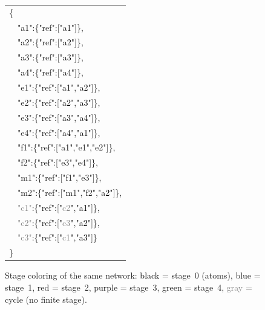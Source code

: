 \begin{figure}[ht]
\centering
\begin{minipage}[t]{0.48\textwidth}
\vspace{0pt}
\centering
\scalebox{1.5}{}
\end{minipage}%
\hspace{4pt}%
\begin{minipage}[t]{0.48\textwidth}
\vspace{0pt}
{\scriptsize\ttfamily
\begin{tabular}{@{}l@{}}
\{\\
\ \ \textcolor{black}{"a1"}:\{"ref":["\textcolor{black}{a1}"]\},\\
\ \ \textcolor{black}{"a2"}:\{"ref":["\textcolor{black}{a2}"]\},\\
\ \ \textcolor{black}{"a3"}:\{"ref":["\textcolor{black}{a3}"]\},\\
\ \ \textcolor{black}{"a4"}:\{"ref":["\textcolor{black}{a4}"]\},\\
\ \ \textcolor{blue!70!black}{"e1"}:\{"ref":["\textcolor{black}{a1}","\textcolor{black}{a2}"]\},\\
\ \ \textcolor{blue!70!black}{"e2"}:\{"ref":["\textcolor{black}{a2}","\textcolor{black}{a3}"]\},\\
\ \ \textcolor{blue!70!black}{"e3"}:\{"ref":["\textcolor{black}{a3}","\textcolor{black}{a4}"]\},\\
\ \ \textcolor{blue!70!black}{"e4"}:\{"ref":["\textcolor{black}{a4}","\textcolor{black}{a1}"]\},\\
\ \ \textcolor{red!70!black}{"f1"}:\{"ref":["\textcolor{black}{a1}","\textcolor{blue!70!black}{e1}","\textcolor{blue!70!black}{e2}"]\},\\
\ \ \textcolor{red!70!black}{"f2"}:\{"ref":["\textcolor{blue!70!black}{e3}","\textcolor{blue!70!black}{e4}"]\},\\
\ \ \textcolor{violet!70!black}{"m1"}:\{"ref":["\textcolor{red!70!black}{f1}","\textcolor{blue!70!black}{e3}"]\},\\
\ \ \textcolor{green!50!black}{"m2"}:\{"ref":["\textcolor{violet!70!black}{m1}","\textcolor{red!70!black}{f2}","\textcolor{black}{a2}"]\},\\
\ \ \textcolor{gray}{"c1"}:\{"ref":["\textcolor{gray}{c2}","\textcolor{black}{a1}"]\},\\
\ \ \textcolor{gray}{"c2"}:\{"ref":["\textcolor{gray}{c3}","\textcolor{black}{a2}"]\},\\
\ \ \textcolor{gray}{"c3"}:\{"ref":["\textcolor{gray}{c1}","\textcolor{black}{a3}"]\}\\
\}
\end{tabular}
}
\end{minipage}
\caption{Stage coloring of the same network: \textcolor{black}{black} = stage~0 (atoms), \textcolor{blue!70!black}{blue} = stage~1, \textcolor{red!70!black}{red} = stage~2, \textcolor{violet!70!black}{purple} = stage~3, \textcolor{green!50!black}{green} = stage~4, \textcolor{gray}{gray} = cycle (no finite stage).}
\label{fig:stage-coloring}
\end{figure}

